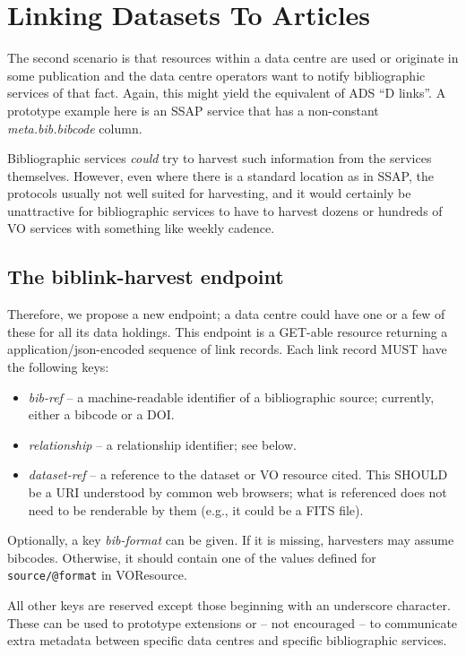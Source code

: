 \documentclass[11pt,a4paper]{ivoa}
\begin{document}
\section{Linking Datasets To Articles}

The second scenario is that resources within a data centre are used or
originate in some publication and the data centre operators want to
notify bibliographic services of that fact.  Again, this might yield the
equivalent of ADS ``D links''.  A prototype example here is an SSAP
\citep{2012ivoa.spec.0210T} service that has a non-constant
\textsl{meta.bib.bibcode} column.

Bibliographic services \emph{could} try to harvest such information from
the services themselves.  However, even where there is a standard
location as in SSAP, the protocols usually not well suited for
harvesting, and it would certainly be unattractive for bibliographic
services to have to harvest dozens or hundreds of VO services with
something like weekly cadence.

\subsection{The biblink-harvest endpoint}

Therefore, we propose a new endpoint; a data centre could have one or a
few of these for all its data holdings.  This endpoint is a GET-able
resource returning a application/json-encoded sequence of link records.
Each link record MUST have the following keys:

\begin{itemize}
\item \emph{bib-ref} -- a machine-readable identifier of a bibliographic
source; currently, either a bibcode or a DOI.
\item \emph{relationship} -- a relationship identifier; see below.
\item \emph{dataset-ref} -- a reference to the dataset or VO resource cited.
This SHOULD be a URI understood by common web browsers; what is referenced
does not need to be renderable by them (e.g., it could be a FITS file).
\end{itemize}

Optionally, a key \emph{bib-format} can be given.  If it is missing,
harvesters may assume bibcodes.  Otherwise, it should contain one of the
values defined for \verb|source/@format| in VOResource.

All other keys are reserved except those beginning with an underscore
character.  These can be used to prototype extensions or -- not
encouraged -- to communicate extra metadata between specific data
centres and specific bibliographic services.
\end{document}
